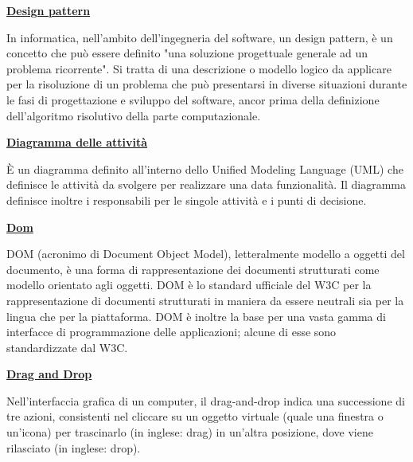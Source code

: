 \bigskip
\begin{addmargin}[0em]{0em}	
	\textbf{\underline{Design pattern}}
\end{addmargin}

\medskip
\begin{addmargin}[5em]{1em}	
In informatica, nell'ambito dell'ingegneria del software, un design pattern, è un concetto che può essere definito "una soluzione progettuale generale ad un problema ricorrente". Si tratta di una descrizione o modello logico da applicare per la risoluzione di un problema che può presentarsi in diverse situazioni durante le fasi di progettazione e sviluppo del software, ancor prima della definizione dell'algoritmo risolutivo della parte computazionale.
\end{addmargin}	

\bigskip
\begin{addmargin}[0em]{0em}	
	\textbf{\underline{Diagramma delle attività}}
\end{addmargin}
	
\medskip
\begin{addmargin}[5em]{1em}	
È un diagramma definito all'interno dello Unified Modeling Language (UML) che definisce le attività da svolgere per realizzare una data funzionalità. Il diagramma definisce inoltre i responsabili per le singole attività e i punti di decisione. 
\end{addmargin}	

\bigskip
\begin{addmargin}[0em]{0em}	
	\textbf{\underline{Dom}}
\end{addmargin}
	
\medskip
\begin{addmargin}[5em]{1em}	
	DOM (acronimo di Document Object Model), letteralmente modello a oggetti del documento, è una forma di rappresentazione dei documenti strutturati come modello orientato agli oggetti.
DOM è lo standard ufficiale del W3C per la rappresentazione di documenti strutturati in maniera da essere neutrali sia per la lingua che per la piattaforma. DOM è inoltre la base per una vasta gamma di interfacce di programmazione delle applicazioni; alcune di esse sono standardizzate dal W3C.
\end{addmargin}	

\bigskip
\begin{addmargin}[0em]{0em}	
	\textbf{\underline{Drag and Drop}}
\end{addmargin}
	
\medskip
\begin{addmargin}[5em]{1em}	
Nell'interfaccia grafica di un computer, il drag-and-drop indica una successione di tre azioni, consistenti nel cliccare su un oggetto virtuale (quale una finestra o un'icona) per trascinarlo (in inglese: drag) in un'altra posizione, dove viene rilasciato (in inglese: drop).
\end{addmargin}	
	
